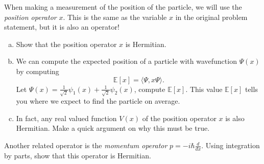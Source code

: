 \documentclass[12pt]{article} %
\newcommand{\innprod}[2]{\langle #1, #2 \rangle}
\begin{document}

\begin{problem}
  When making a measurement of the position of the particle, we will use the \emph{position operator} $x$.  This is the same as the variable $x$ in the original problem statement, but it is also an operator!
   \begin{enumerate}[(a)]
   		\item Show that the position operator $x$ is Hermitian.
   		\item We can compute the expected position of a particle with wavefunction $\Psi(x)$ by computing
   		\[
   		\mathbb{E}[x]=\innprod{\Psi}{x\Psi}.
   		\]
   		Let $\Psi(x) = \frac{1}{\sqrt{2}} \psi_1(x) + \frac{1}{\sqrt{2}} \psi_2(x)$, compute $\mathbb{E}[x]$. This value $\mathbb{E}[x]$ tells you where we expect to find the particle on average.
        \item In fact, any real valued function $V(x)$ of the position operator $x$ is also Hermitian. Make a quick argument on why this must be true.
   	\end{enumerate}
\end{problem}

\begin{problem}
	Another related operator is the \emph{momentum operator} $p = -i\hbar \frac{d}{dx}$. Using integration by parts, show that this operator is Hermitian.
\end{problem}
\end{document}
